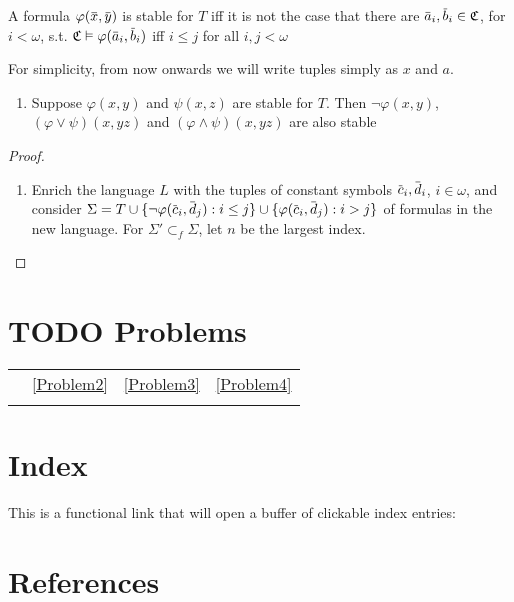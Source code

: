 \documentclass[11pt]{article}
\begin{document}
\begin{remark}
A formula \(\varphi(\barx,\bary)\) is stable for \(T\) iff it is not the case that there
are \(\bara_i,\barb_i\in\fC\), for \(i<\omega\), s.t. \(\fC\vDash\varphi(\bara_i,\barb_i)\) iff \(i\le j\) for all \(i,j<\omega\)
\end{remark}

For simplicity, from now onwards we will write tuples simply as \(x\) and \(a\).

\begin{lemma}[]
\begin{enumerate}
\item Suppose \(\varphi(x,y)\) and \(\psi(x,z)\) are stable for \(T\). Then \(\neg\varphi(x,y)\), \((\varphi\vee\psi)(x,yz)\)
and \((\varphi\wedge\psi)(x,yz)\) are also stable
\end{enumerate}
\end{lemma}

\begin{proof}
\begin{enumerate}
\item Enrich the language \(L\) with the tuples of constant symbols \(\barc_i,\bard_i\), \(i\in\omega\), and
consider \(\Sigma=T\cup\{\neg\varphi(\barc_i,\bard_j):i\le j\}\cup\{\varphi(\barc_i,\bard_j):i>j\}\) of formulas in the new
language. For \(\Sigma'\subset_f\Sigma\), let \(n\) be the largest index.
\end{enumerate}
\end{proof}

\section{{\bfseries\sffamily TODO} Problems}
\label{sec:orga564fe2}
\begin{center}
\begin{tabular}{llll}
 & \ref{Problem2} & \ref{Problem3} & \ref{Problem4}\\
 &  & \\
\end{tabular}
\end{center}

\section{Index}
\label{sec:org28aa420}

This is a functional link that will open a buffer of clickable index entries:

\renewcommand{\indexname}{}
\printindex

\section{References}
\label{sec:orgf2844ea}

\label{bibliographystyle link}


\label{bibliography link}

\end{document}
